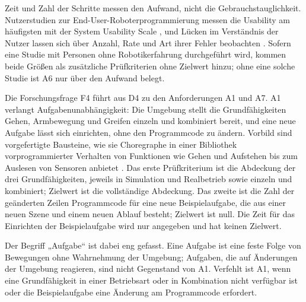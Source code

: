 Zeit und Zahl der Schritte messen den Aufwand, nicht die Gebrauchstauglichkeit.
Nutzerstudien zur End-User-Roboterprogrammierung messen die Usability am häufigsten mit der System Usability Scale \cite{Ajaykumar2021}, und Lücken im Verständnis der Nutzer lassen sich über Anzahl, Rate und Art ihrer Fehler beobachten \cite{Ajaykumar2021}.
Sofern eine Studie mit Personen ohne Robotikerfahrung durchgeführt wird, kommen beide Größen als zusätzliche Prüfkriterien ohne Zielwert hinzu; ohne eine solche Studie ist A6 nur über den Aufwand belegt.

Die Forschungsfrage F4 führt aus D4 zu den Anforderungen A1 und A7.
A1 verlangt Aufgabenunabhängigkeit: Die Umgebung stellt die Grundfähigkeiten Gehen, Armbewegung und Greifen einzeln und kombiniert bereit, und eine neue Aufgabe lässt sich einrichten, ohne den Programmcode zu ändern.
Vorbild sind vorgefertigte Bausteine, wie sie Choregraphe in einer Bibliothek vorprogrammierter Verhalten von Funktionen wie Gehen und Aufstehen bis zum Auslesen von Sensoren anbietet \cite{Pot2009}.
Das erste Prüfkriterium ist die Abdeckung der drei Grundfähigkeiten, jeweils in Simulation und Realbetrieb sowie einzeln und kombiniert; Zielwert ist die vollständige Abdeckung. %
Das zweite ist die Zahl der geänderten Zeilen Programmcode für eine neue Beispielaufgabe, die aus einer neuen Szene und einem neuen Ablauf besteht; Zielwert ist null. %
Die Zeit für das Einrichten der Beispielaufgabe wird nur angegeben und hat keinen Zielwert. %

Der Begriff „Aufgabe“ ist dabei eng gefasst.
Eine Aufgabe ist eine feste Folge von Bewegungen ohne Wahrnehmung der Umgebung; Aufgaben, die auf Änderungen der Umgebung reagieren, sind nicht Gegenstand von A1.
Verfehlt ist A1, wenn eine Grundfähigkeit in einer Betriebsart oder in Kombination nicht verfügbar ist oder die Beispielaufgabe eine Änderung am Programmcode erfordert.

